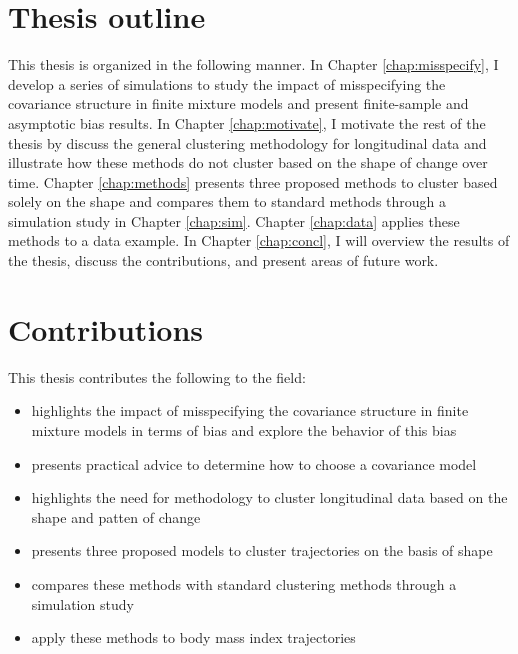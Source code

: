 \section{Thesis outline}
This thesis is organized in the following manner. In Chapter \ref{chap:misspecify}, I develop a series of simulations to study the impact of misspecifying the covariance structure in finite mixture models and present finite-sample and asymptotic bias results. In Chapter \ref{chap:motivate}, I motivate the rest of the thesis by discuss the general clustering methodology for longitudinal data and illustrate how these methods do not cluster based on the shape of change over time. Chapter \ref{chap:methods} presents three proposed methods to cluster based solely on the shape and compares them to standard methods through a simulation study in Chapter \ref{chap:sim}. Chapter \ref{chap:data} applies these methods to a data example. In Chapter \ref{chap:concl}, I will overview the results of the thesis, discuss the contributions, and present areas of future work. 

\section{Contributions}
This thesis contributes the following to the field:
\begin{itemize}
\item highlights the impact of misspecifying the covariance structure in finite mixture models in terms of bias and explore the behavior of this bias
\item presents practical advice to determine how to choose a covariance model
\item highlights the need for methodology to cluster longitudinal data based on the shape and patten of change
\item presents three proposed models to cluster trajectories on the basis of shape
\item compares these methods with standard clustering methods through a simulation study
\item apply these methods to body mass index trajectories
\end{itemize}
